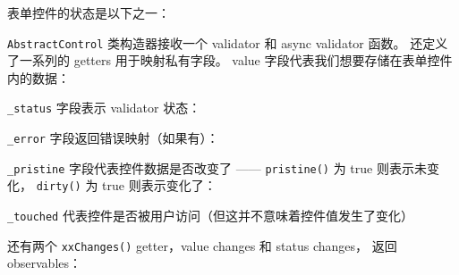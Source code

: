 
表单控件的状态是以下之一：




\texttt{AbstractControl} 类构造器接收一个 validator 和 async validator 函数。
还定义了一系列的 getters 用于映射私有字段。
value 字段代表我们想要存储在表单控件内的数据：




\texttt{\_status} 字段表示 validator 状态：




\texttt{\_error} 字段返回错误映射（如果有）：




\texttt{\_pristine} 字段代表控件数据是否改变了 —— \texttt{pristine()} 为 true 则表示未变化，
\texttt{dirty()} 为 true 则表示变化了：




\texttt{\_touched} 代表控件是否被用户访问（但这并不意味着控件值发生了变化）




还有两个 \texttt{xxChanges()} getter，value changes 和 status changes，
返回 observables：

